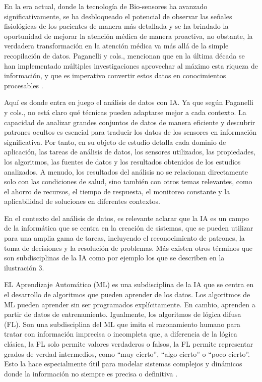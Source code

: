 En la era actual, donde la tecnología de Bio-sensores ha avanzado significativamente, se ha desbloqueado el potencial de observar las señales fisiológicas de los pacientes de manera más detallada y se ha brindado la oportunidad de mejorar la atención médica de manera proactiva, no obstante, la verdadera transformación en la atención médica va más allá de la simple recopilación de datos. Paganelli y cols., mencionan que en la última década se han implementado múltiples investigaciones aprovechar al máximo esta riqueza de información, y que es imperativo convertir estos datos en conocimientos procesables \citep{Paganelli2022RealTime}.

Aquí es donde entra en juego el análisis de datos con IA. Ya que según Paganelli y cols., no está claro qué técnicas pueden adaptarse mejor a cada contexto. La capacidad de analizar grandes conjuntos de datos de manera eficiente y descubrir patrones ocultos es esencial para traducir los datos de los sensores en información significativa. Por tanto, en su objeto de estudio detalla cada dominio de aplicación, las tareas de análisis de datos, los sensores utilizados, las propiedades, los algoritmos, las fuentes de datos y los resultados obtenidos de los estudios analizados. A menudo, los resultados del análisis no se relacionan directamente solo con las condiciones de salud, sino también con otros temas relevantes, como el ahorro de recursos, el tiempo de respuesta, el monitoreo constante y la aplicabilidad de soluciones en diferentes contextos.

En el contexto del análisis de datos, es relevante aclarar que la IA es un campo de la informática que se centra en la creación de sistemas, que se pueden utilizar para una amplia gama de tareas, incluyendo el reconocimiento de patrones, la toma de decisiones y la resolución de problemas. Más existen otros términos que son subdisciplinas de la IA como por ejemplo los que se describen en la ilustración 3.

EL Aprendizaje Automático (ML) es una subdisciplina de la IA que se centra en el desarrollo de algoritmos que pueden aprender de los datos. Los algoritmos de ML pueden aprender sin ser programados explícitamente. En cambio, aprenden a partir de datos de entrenamiento. Igualmente, los algoritmos de lógica difusa (FL). Son una subdisciplina del ML que imita el razonamiento humano para tratar con información imprecisa o incompleta que, a diferencia de la lógica clásica, la FL solo permite valores verdaderos o falsos, la FL permite representar grados de verdad intermedios, como ``muy cierto'', ``algo cierto'' o ``poco cierto''. Esto la hace especialmente útil para modelar sistemas complejos y dinámicos donde la información no siempre es precisa o definitiva \citep{Kaur2022}.

